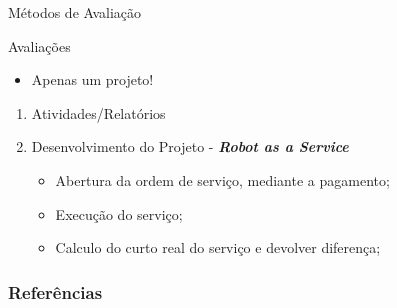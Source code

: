 \documentclass[aspectratio=169]{beamer}
\begin{document}
\begin{frame}{Métodos de Avaliação}
	\begin{block}{Avaliações}
		\begin{itemize}
			\item Apenas um projeto!
		\end{itemize}
		\begin{enumerate}
			\item Atividades/Relatórios
			\item Desenvolvimento do Projeto - \textbf{\textit{Robot as a Service}}
			      \begin{itemize}
				      \item Abertura da ordem de serviço, mediante a pagamento;
				      \item Execução do serviço;
				      \item Calculo do curto real do serviço e devolver diferença;
			      \end{itemize}
		\end{enumerate}
	\end{block}
\end{frame}



\begin{frame}[t, allowframebreaks]
	\frametitle{Referências}
	
\end{frame}
\end{document}
